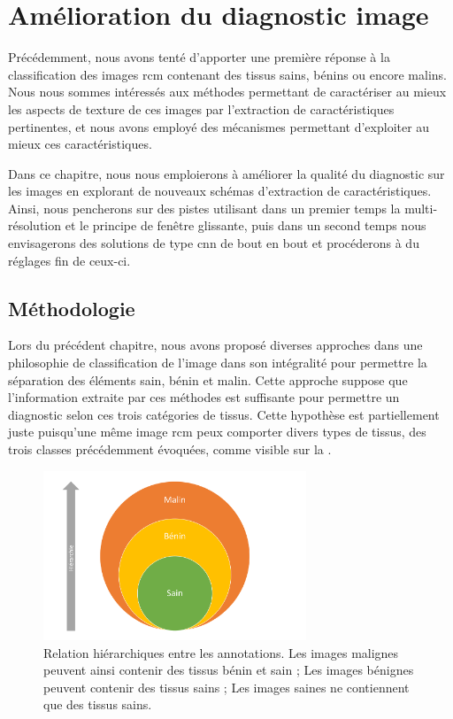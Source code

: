 \chapter{Amélioration du diagnostic image}
\label{chap:chapter_5}
\chapterintro
Précédemment, nous avons tenté d'apporter une première réponse à la classification des images \gls{rcm} contenant des tissus sains, bénins ou encore malins. Nous nous sommes intéressés aux méthodes permettant de caractériser au mieux les aspects de texture de ces images par l'extraction de caractéristiques pertinentes, et nous avons employé des mécanismes permettant d'exploiter au mieux ces caractéristiques.\par

Dans ce chapitre, nous nous emploierons à améliorer la qualité du diagnostic sur les images en explorant de nouveaux schémas d'extraction de caractéristiques. Ainsi, nous pencherons sur des pistes utilisant dans un premier temps la multi-résolution et le principe de fenêtre glissante, puis dans un second temps nous envisagerons des solutions de type \gls{cnn} de bout en bout et procéderons à du réglages fin de ceux-ci.\par

\newpage

\section{Méthodologie}
Lors du précédent chapitre, nous avons proposé diverses approches dans une philosophie de classification de l'image dans son intégralité pour permettre la séparation des éléments sain, bénin et malin. Cette approche suppose que l'information extraite par ces méthodes est suffisante pour permettre un diagnostic selon ces trois catégories de tissus. Cette hypothèse est partiellement juste puisqu'une même image \gls{rcm} peux comporter divers types de tissus, des trois classes précédemment évoquées, comme visible sur la .\par

\begin{figure}[H]
    \centering
    \includegraphics[width=0.7\textwidth]{contents/chapter_5/resources/scheme_image_improvement_annotations_hierarchy.pdf}
    \caption{Relation hiérarchiques entre les annotations. Les images malignes peuvent ainsi contenir des tissus bénin et sain ; Les images bénignes peuvent contenir des tissus sains ; Les images saines ne contiennent que des tissus sains.}
    \label{fig:scheme_image_improvement_annotations_hierarchy}
\end{figure}\par

